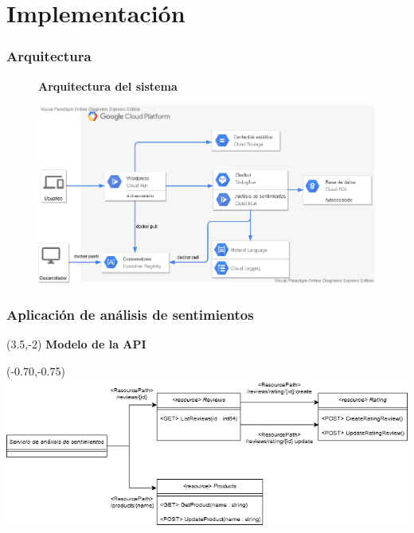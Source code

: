 \documentclass[10pt]{beamer}
\begin{document}
\section{Implementación}
\begin{frame}
\frametitle{Arquitectura}
\vspace{-0.5cm}
\begin{figure}[htbp]
	\begin{center}
		\large{\textbf{\textcolor{pantone}{Arquitectura del sistema}}}\par\medskip\medskip\medskip\medskip
		\includegraphics[width = 1\textwidth]{Figuras/ArquitecturaV3.png}
	\end{center}
\end{figure}
\end{frame}

\begin{frame}
\frametitle{Aplicación de análisis de sentimientos}
\vspace{-1.5cm}
\begin{textblock}{15}(3.5,-2)
	\large{\textbf{\textcolor{pantone}{Modelo de la API}}}
\end{textblock}
\begin{textblock}{10.5}(-0.70,-0.75)
	\includegraphics[width = 1.15\textwidth]{Figuras/ClassDiagram-Page-2.png}
\end{textblock}
	
\end{frame}
\end{document}
